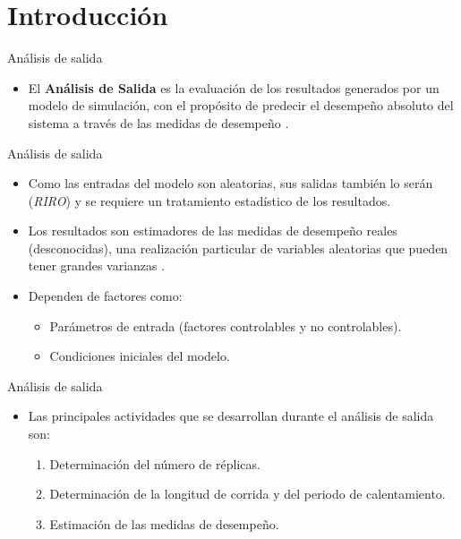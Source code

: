 \section{Introducción}

\begin{frame}{Análisis de salida}
    \begin{itemize}
        \item El \textbf{Análisis de Salida} es la evaluación de los resultados generados por un modelo de simulación, con el propósito de predecir el desempeño absoluto del sistema a través de las medidas de desempeño \cite{BCN}.
    \end{itemize}
\end{frame}

\begin{frame}{Análisis de salida}
    \begin{itemize}
        \item Como las entradas del modelo son aleatorias, sus salidas también lo serán (\textit{RIRO}) y se requiere un tratamiento estadístico de los resultados.
        \item Los resultados son estimadores de las medidas de desempeño reales (desconocidas), una realización particular de variables aleatorias que pueden tener grandes varianzas \cite{LK}.
        \item Dependen de factores como:
        \begin{itemize}
            \item Parámetros de entrada (factores controlables y no controlables).
            \item Condiciones iniciales del modelo.
        \end{itemize}
    \end{itemize}
\end{frame}

\begin{frame}{Análisis de salida}
    \begin{itemize}
        \item Las principales actividades que se desarrollan durante el análisis de salida son:
        \begin{enumerate}
            \item Determinación del número de réplicas.
            \item Determinación de la longitud de corrida y del periodo de calentamiento.
            \item Estimación de las medidas de desempeño.
        \end{enumerate}
    \end{itemize}
\end{frame}

